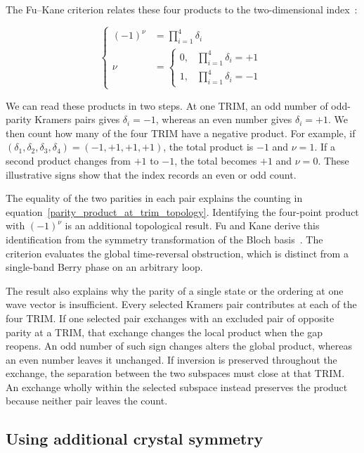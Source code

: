 The Fu--Kane criterion relates these four products to the two-dimensional index~\cite{fu2007topological}:

\begin{equation}
\left\{\begin{aligned}
    (-1)^\nu&=\prod_{i=1}^{4}\delta_i \\
    \nu&=
    \begin{cases}
        0, & \prod_{i=1}^{4}\delta_i=+1 \\
        1, & \prod_{i=1}^{4}\delta_i=-1
    \end{cases}
\end{aligned}\right.
\label{fu_kane_index_topology}
\end{equation}

We can read these products in two steps.
At one TRIM, an odd number of odd-parity Kramers pairs gives $\delta_i=-1$,
whereas an even number gives $\delta_i=+1$.
We then count how many of the four TRIM have a negative product.
For example, if $(\delta_1,\delta_2,\delta_3,\delta_4)=(-1,+1,+1,+1)$,
the total product is $-1$ and $\nu=1$.
If a second product changes from $+1$ to $-1$, the total becomes $+1$ and $\nu=0$.
These illustrative signs show that the index records an even or odd count.

The equality of the two parities in each pair explains the counting in equation~\eqref{parity_product_at_trim_topology}.
Identifying the four-point product with $(-1)^\nu$ is an additional topological result.
Fu and Kane derive this identification from the symmetry transformation of the Bloch basis~\cite[sections II and III]{fu2007topological}.
The criterion evaluates the global time-reversal obstruction,
which is distinct from a single-band Berry phase on an arbitrary loop.

The result also explains why the parity of a single state or the ordering at one wave vector is insufficient.
Every selected Kramers pair contributes at each of the four TRIM.
If one selected pair exchanges with an excluded pair of opposite parity at a TRIM,
that exchange changes the local product when the gap reopens.
An odd number of such sign changes alters the global product,
whereas an even number leaves it unchanged.
If inversion is preserved throughout the exchange, the separation between the two subspaces must close at that TRIM.
An exchange wholly within the selected subspace instead preserves the product because neither pair leaves the count.

\subsection{Using additional crystal symmetry}

